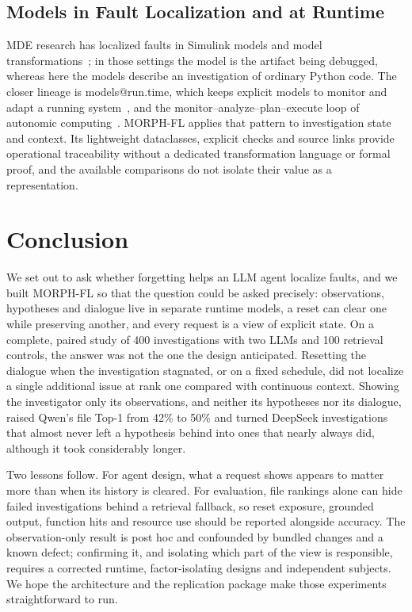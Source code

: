 \documentclass[a4paper,fleqn]{cas-sc}
\newcommand{\tool}{MORPH-FL}
\begin{document}
\subsection{Models in Fault Localization and at Runtime}\label{sec:related_mde}
MDE research has localized faults in Simulink models and model transformations~\citep{simfl2016,mtspectrum2018}; in those settings the model is the artifact being debugged, whereas here the models describe an investigation of ordinary Python code. The closer lineage is models@run.time, which keeps explicit models to monitor and adapt a running system~\citep{modelsruntime2009}, and the monitor--analyze--plan--execute loop of autonomic computing~\citep{mapek2003}. \tool{} applies that pattern to investigation state and context. Its lightweight dataclasses, explicit checks and source links provide operational traceability without a dedicated transformation language or formal proof, and the available comparisons do not isolate their value as a representation.

\section{Conclusion}\label{sec:conclusion}
We set out to ask whether forgetting helps an LLM agent localize faults, and we built \tool{} so that the question could be asked precisely: observations, hypotheses and dialogue live in separate runtime models, a reset can clear one while preserving another, and every request is a view of explicit state. On a complete, paired study of 400 investigations with two LLMs and 100 retrieval controls, the answer was not the one the design anticipated. Resetting the dialogue when the investigation stagnated, or on a fixed schedule, did not localize a single additional issue at rank one compared with continuous context. Showing the investigator only its observations, and neither its hypotheses nor its dialogue, raised Qwen's file Top-1 from 42\% to 50\% and turned DeepSeek investigations that almost never left a hypothesis behind into ones that nearly always did, although it took considerably longer.

Two lessons follow. For agent design, what a request shows appears to matter more than when its history is cleared. For evaluation, file rankings alone can hide failed investigations behind a retrieval fallback, so reset exposure, grounded output, function hits and resource use should be reported alongside accuracy. The observation-only result is post hoc and confounded by bundled changes and a known defect; confirming it, and isolating which part of the view is responsible, requires a corrected runtime, factor-isolating designs and independent subjects. We hope the architecture and the replication package make those experiments straightforward to run.
\end{document}
